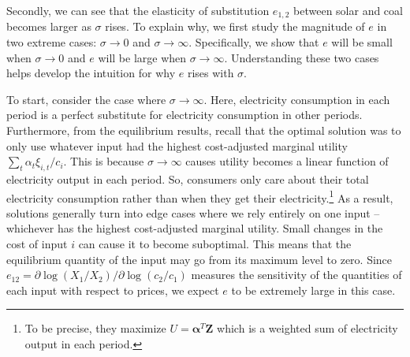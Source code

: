 \documentclass[11pt,a4paper,leqno]{extarticle}
\begin{document}
	
	
	
	Secondly, we can see that the elasticity of substitution $e_{1,2}$ between solar and coal becomes larger  as $\sigma$ rises. To  explain why, we first study the magnitude of $e$ in two extreme cases:  $\sigma \to 0$ and $\sigma \to \infty$. Specifically, we show that $e$ will be small when $\sigma \to 0$ and $e$ will be large when $\sigma \to \infty$. Understanding these two cases helps develop the intuition for why $e$ rises with $\sigma$. 
	
	To start, consider the case where $\sigma \to \infty$. Here, electricity consumption in each period is a perfect substitute for electricity consumption in other periods. Furthermore, from the equilibrium results, recall that the optimal solution was to only use whatever input had the highest cost-adjusted marginal utility $\sum_t \alpha_t \xi_{i,t} /c_i$. This is because $\sigma \to \infty$ causes utility becomes a linear function of electricity output in each period. So, consumers only care about their total electricity consumption rather than when they get their electricity.\footnote{ To be precise, they maximize $U = \boldsymbol{\alpha}^T \mathbf{Z}$ which is a weighted sum of electricity output in each period. 
	}  As a result, solutions generally turn into edge cases where we rely entirely on one input -- whichever has the highest cost-adjusted marginal utility. Small changes in the cost of input $i$ can cause it to become suboptimal. This means that the equilibrium quantity of the input may go from its maximum level to zero. Since $e_{12} = \partial \log(X_1/X_2) / \partial \log(c_2/c_1)$ measures the sensitivity of the quantities of each input with respect to prices, we expect $e$ to be extremely large in this case. 
	
\end{document}
